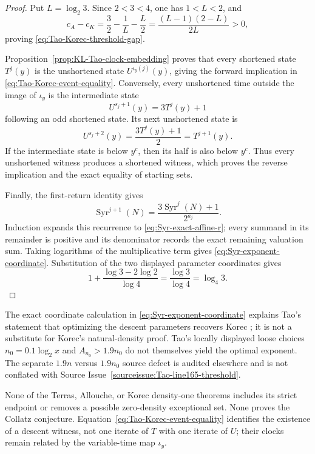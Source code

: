 \begin{proof}
Put \(L=\log_2 3\).  Since \(2<3<4\), one has \(1<L<2\), and
\[
 c_A-c_K
 =\frac32-\frac1L-\frac L2
 =\frac{(L-1)(2-L)}{2L}>0,
\]
proving \eqref{eq:Tao-Korec-threshold-gap}.

Proposition~\ref{prop:KL-Tao-clock-embedding} proves that every shortened
state \(T^j(y)\) is the unshortened state \(U^{\iota_y(j)}(y)\), giving the
forward implication in \eqref{eq:Tao-Korec-event-equality}.  Conversely,
every unshortened time outside the image of \(\iota_y\) is the intermediate
state
\[
 U^{s_j+1}(y)=3T^j(y)+1
\]
following an odd shortened state.  Its next unshortened state is
\[
 U^{s_j+2}(y)=\frac{3T^j(y)+1}{2}=T^{j+1}(y).
\]
If the intermediate state is below \(y^c\), then its half is also below
\(y^c\).  Thus every unshortened witness produces a shortened witness,
which proves the reverse implication and the exact equality of starting
sets.

Finally, the first-return identity gives
\[
 \operatorname{Syr}^{j+1}(N)
 =\frac{3\operatorname{Syr}^j(N)+1}{2^{a_j}}.
\]
Induction expands this recurrence to \eqref{eq:Syr-exact-affine-r}; every
summand in its remainder is positive and its denominator records the exact
remaining valuation sum.  Taking logarithms of the multiplicative term
gives \eqref{eq:Syr-exponent-coordinate}.  Substitution of the two displayed
parameter coordinates gives
\[
 1+\frac{\log3-2\log2}{\log4}
 =\frac{\log3}{\log4}
 =\log_4 3.
\]
\end{proof}

\begin{nonclaim}
The exact coordinate calculation in
\eqref{eq:Syr-exponent-coordinate} explains Tao's statement that optimizing
the descent parameters recovers Korec
\cite[source line~695]{Tao2026v7}; it is not a substitute for Korec's
natural-density proof.  Tao's locally displayed loose choices
\(n_0=0.1\log_2x\) and \(A_{n_0}>1.9n_0\) do not themselves yield the
optimal exponent.  The separate \(1.9n\) versus \(1.9n_0\) source defect is
audited elsewhere and is not conflated with
Source Issue~\ref{sourceissue:Tao-line165-threshold}.

None of the Terras, Allouche, or Korec density-one theorems includes its
strict endpoint or removes a possible zero-density exceptional set.  None
proves the Collatz conjecture.  Equation~\eqref{eq:Tao-Korec-event-equality}
identifies the existence of a descent witness, not one iterate of \(T\) with
one iterate of \(U\); their clocks remain related by the variable-time map
\(\iota_y\).
\end{nonclaim}

